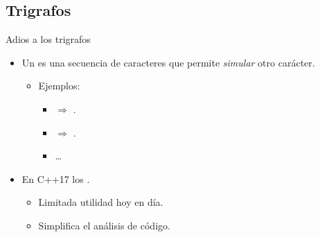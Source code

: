 \subsection{Trigrafos}

\begin{frame}[t]{Adios a los trigrafos}
\begin{itemize}
  \item Un  es una secuencia de caracteres que permite \emph{simular}
        otro carácter.
    \begin{itemize}
      \item Ejemplos:
        \begin{itemize}
          \item {} \quad $\Rightarrow$ \quad \cppid{\#}.
          \item {} \quad $\Rightarrow$ \quad \cppid{\~}.
          \item \ldots
        \end{itemize}
    \end{itemize}

  \vfill\pause
  \item En C++17 los  .
    \begin{itemize}
      \item Limitada utilidad hoy en día.
      \item Simplifica el análisis de código.
    \end{itemize}
\end{itemize}
\end{frame}
